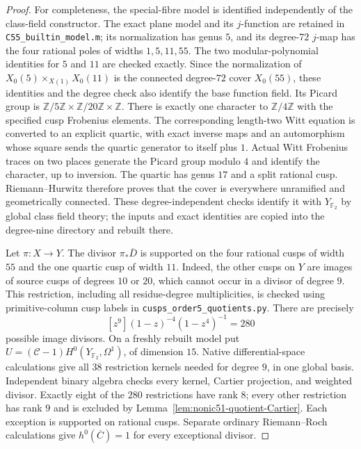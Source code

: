 \begin{proof}
For completeness, the special-fibre model is identified independently
of the class-field constructor. The exact plane model and its
$j$-function are retained in \texttt{C55\_builtin\_model.m}; its
normalization has genus $5$, and its degree-$72$ $j$-map has the four
rational poles of widths $1,5,11,55$. The two modular-polynomial
identities for $5$ and $11$ are checked exactly. Since the normalization
of $X_0(5)\times_{X(1)}X_0(11)$ is the connected degree-$72$ cover
$X_0(55)$, these identities and the degree check also identify the
base function field. Its Picard group is
$\mathbb Z/5\mathbb Z\times\mathbb Z/20\mathbb Z\times\mathbb Z$.
There is exactly one character to $\mathbb Z/4\mathbb Z$ with the
specified cusp Frobenius elements. The corresponding length-two Witt
equation is converted to an explicit quartic, with exact inverse
maps and an automorphism whose square sends the quartic generator
to itself plus $1$. Actual Witt Frobenius traces on two places
generate the Picard group modulo $4$ and identify the character,
up to inversion. The quartic has genus $17$ and a split rational
cusp. Riemann--Hurwitz therefore proves that the cover is everywhere
unramified and geometrically connected. These degree-independent checks identify it
with $Y_{\mathbb F_2}$ by global class field theory; the inputs and
exact identities are copied into the degree-nine directory and rebuilt there.

Let $\pi:X\longrightarrow Y$. The divisor $\pi_*\overline D$ is
supported on the four rational cusps of width $55$ and the one
quartic cusp of width $11$. Indeed, the other cusps on $Y$ are images
of source cusps of degrees $10$ or $20$, which cannot occur in a
divisor of degree $9$. This restriction, including all residue-degree
multiplicities, is checked using primitive-column cusp labels in
\texttt{cusps\_order5\_quotients.py}. There are precisely
\[
 [z^9](1-z)^{-4}(1-z^4)^{-1}=280
\]
possible image divisors. On a freshly rebuilt model put
$U=(\mathcal C-1)H^0(Y_{\mathbb F_2},\Omega^1)$, of dimension $15$.
Native differential-space calculations give all $38$ restriction
kernels needed for degree $9$, in one global basis.
Independent binary algebra checks every kernel, Cartier projection,
and weighted divisor. Exactly eight of the $280$ restrictions have
rank $8$; every other restriction has rank $9$ and is excluded by
Lemma~\ref{lem:nonic51-quotient-Cartier}.
Each exception is supported on rational cusps.
Separate ordinary Riemann--Roch calculations give $h^0(\overline C)=1$
for every exceptional divisor.


\end{proof}
